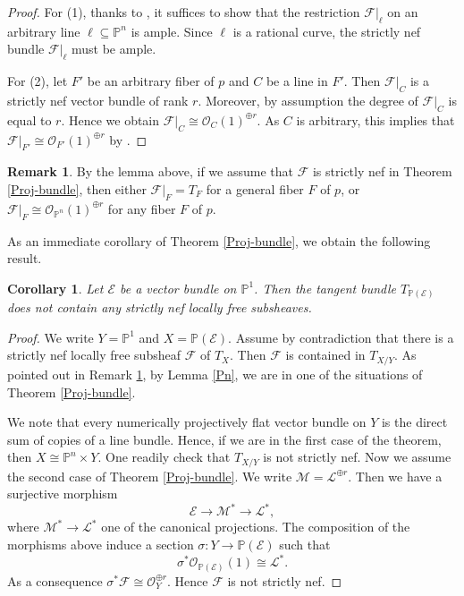 \documentclass[english,reqno]{amsart}
\newcommand\bbP{{\mathbb P}}
\newcommand\sE{{\mathscr E}}
\newcommand\sF{{\mathscr F}}
\newcommand\sL{{\mathscr L}}
\newcommand\sM{{\mathscr M}}
\newcommand\sO{{\mathscr O}}
\theoremstyle{plain}
\newtheorem{cor}[thm]{Corollary}
\theoremstyle{definition}
\newtheorem{remark}[thm]{Remark}
\numberwithin{equation}{section} %
\begin{document}
\begin{proof}
    For (1), thanks to \cite[Theorem 4.2]{AproduKebekusPeternell2008}, it suffices to show that the restriction $\sF\vert_{\ell}$ on an arbitrary  line $\ell \subseteq \bbP^n$ is ample. Since  $\ell$ is a rational curve, the strictly nef bundle $\sF\vert_{\ell}$ must be ample.
    
    For (2), let $F'$ be an arbitrary fiber of $p$ and $C$ be a  line in $F'$.
Then $\sF|_C$ is a strictly nef vector bundle of rank $r$. Moreover, by assumption the degree of $\sF|_C$ is equal to $r$.
Hence we obtain $\sF|_C \cong \sO_{C}(1)^{\oplus r}$. As $C$ is arbitrary, this implies that $\sF|_{F'} \cong \sO_{F'}(1)^{\oplus r}$ by \cite[Proposition 1.2]{AndreattaWisniewski2001}.
\end{proof}


\begin{remark}
	\label{remark:strictly-nef}
	By the lemma above, if we assume that $\sF$ is strictly nef in Theorem \ref{Proj-bundle}, then  either $\sF\vert_F=T_F$ for a general fiber $F$ of $p$, or $\sF\vert_F\cong  \sO_{\bbP^n}(1)^{\oplus r}$ for any fiber $F$ of $p$. 
\end{remark}



As an immediate corollary of Theorem \ref{Proj-bundle}, we obtain  the following result.

\begin{cor}\label{cor:proj-vector-bundle-p1-base}
Let $\sE$ be a vector bundle on $\mathbb{P}^1$. Then the tangent bundle $T_{\mathbb{P}(\sE)}$ does not contain any strictly nef locally free subsheaves.
\end{cor}

\begin{proof}
We write $Y=\mathbb{P}^1$ and $X=\mathbb{P}(\sE)$.
Assume by contradiction that there is a strictly nef locally free subsheaf $\sF$ of $T_{X}$. Then $\sF$ is contained in $T_{X/Y}$.
As pointed out in Remark \ref{remark:strictly-nef}, by Lemma \ref{Pn}, we are in one of the  situations of  Theorem \ref{Proj-bundle}.

We note that  every numerically projectively flat vector bundle on $Y$ is the direct sum of copies of a line bundle. Hence, if we are in the first case of the theorem, then $X\cong \mathbb{P}^n\times Y$. One readily check that $T_{X/Y}$ is not strictly nef.
Now we assume the second case of Theorem \ref{Proj-bundle}. We write $\sM=\sL^{\oplus r}$. Then we have  a surjective morphism $$\sE \to \sM^* \to \sL^*,$$ where $\sM^* \to \sL^*$ one of the canonical projections.
The composition of the morphisms above induce a section $\sigma\colon Y\to {\mathbb{P}(\sE)}$ such that $$\sigma^*\sO_{\mathbb{P}(\sE)}(1) \cong \sL^*.$$ As a consequence  $\sigma^*\sF\cong \sO_Y^{\oplus r}$.  Hence $\sF$ is not strictly nef.
\end{proof}
\end{document}
